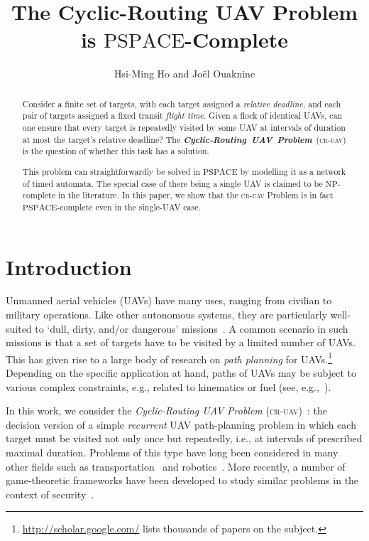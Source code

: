 \documentclass[envcountsame]{llncs}
\title{The Cyclic-Routing UAV Problem is $\mathrm{PSPACE}$-Complete}
\author{Hsi-Ming Ho and Jo\"el Ouaknine}
\institute{Department of Computer Science, University of Oxford \\ Wolfson Building, Parks Road, Oxford, OX1 3QD, UK}
\begin{document}
\maketitle
\thispagestyle{plain}
\begin{abstract}
Consider a finite set of targets, with each target assigned a
\emph{relative deadline}, and each pair of targets assigned a fixed
transit \emph{flight time}. Given a flock of identical UAVs, can
one ensure that every target is repeatedly visited by some UAV at
intervals of duration at most the target's relative deadline? The
\mbox{\emph{\textbf{Cyclic-Routing UAV Problem}} \textsc{(cr-uav)}} is the question of
whether this task has a solution.

This problem can straightforwardly be solved in $\mathrm{PSPACE}$ by
modelling it as a network of timed automata. The special case of there
being a single UAV is claimed to be $\mathrm{NP}$-complete in the
literature. In this paper, we show that the \textsc{cr-uav} Problem is in
fact $\mathrm{PSPACE}$-complete even in the single-UAV case.
\end{abstract}

\section{Introduction}

Unmanned aerial vehicles (UAVs) have many uses, ranging from civilian
to military operations. Like other autonomous systems, they are
particularly well-suited to `dull, dirty, and/or dangerous'
missions~\cite{UAVS}.  A common scenario in such missions is that a
set of targets have to be visited by a limited number of UAVs.  This
has given rise to a large body of research on \emph{path planning} for
UAVs.\footnote{\url{http://scholar.google.com/} lists thousands of papers on the subject.} Depending on the specific application at hand, paths of UAVs
may be subject to various complex constraints, e.g., related to kinematics or
fuel (see, e.g.,~\cite{Alighanbari2003, Elizabeth2012, Yang2002,
  Richards2002}).


In this work, we consider the \emph{Cyclic-Routing UAV Problem} (\textsc{cr-uav})~\cite{Drucker2010}:
the decision version of a simple \emph{recurrent}
UAV path-planning problem in which each target must be visited not only
once but repeatedly, i.e., at intervals of prescribed maximal duration. 
Problems of this type have long been considered in many other fields
such as transportation~\cite{Orlin1982, Wollmer1990} and
robotics~\cite{Crama1997, Kats1997}.  More recently, a number of
game-theoretic frameworks have been developed to study similar
problems in the context of security~\cite{Tsai2009, Jain2010,
  Basilico2012}.
\end{document}
